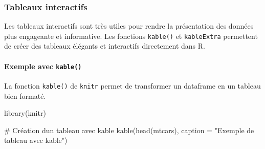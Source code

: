 \documentclass[
  letterpaper,
  DIV=11,
  numbers=noendperiod]{scrreprt}
\let\oldparagraph\paragraph
\renewcommand{\paragraph}[1]{\oldparagraph{#1}\mbox{}}
\newenvironment{Shaded}{\begin{snugshade}}{\end{snugshade}}
\newcommand{\AttributeTok}[1]{\textcolor[rgb]{0.40,0.45,0.13}{#1}}
\newcommand{\CommentTok}[1]{\textcolor[rgb]{0.37,0.37,0.37}{#1}}
\newcommand{\FunctionTok}[1]{\textcolor[rgb]{0.28,0.35,0.67}{#1}}
\newcommand{\NormalTok}[1]{\textcolor[rgb]{0.00,0.23,0.31}{#1}}
\newcommand{\StringTok}[1]{\textcolor[rgb]{0.13,0.47,0.30}{#1}}
\begin{document}
\subsubsection{Tableaux interactifs}\label{tableaux-interactifs}

Les tableaux interactifs sont très utiles pour rendre la présentation
des données plus engageante et informative. Les fonctions
\texttt{kable()} et \texttt{kableExtra} permettent de créer des tableaux
élégants et interactifs directement dans R.

\paragraph{\texorpdfstring{Exemple avec
\texttt{kable()}}{Exemple avec kable()}}\label{exemple-avec-kable}

La fonction \texttt{kable()} de \texttt{knitr} permet de transformer un
dataframe en un tableau bien formaté.

\begin{Shaded}
\begin{Highlighting}[]
\FunctionTok{library}\NormalTok{(knitr)}

\CommentTok{\# Création d\textquotesingle{}un tableau avec kable}
\FunctionTok{kable}\NormalTok{(}\FunctionTok{head}\NormalTok{(mtcars), }\AttributeTok{caption =} \StringTok{"Exemple de tableau avec kable"}\NormalTok{)}
\end{Highlighting}
\end{Shaded}
\end{document}
